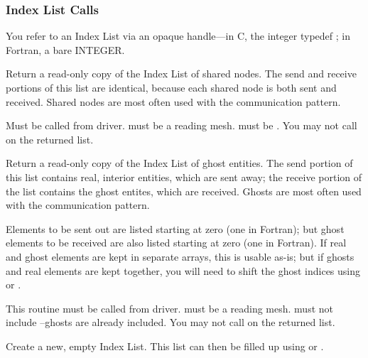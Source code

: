 \subsubsection{Index List Calls}

You refer to an Index List via an opaque handle---in C, the integer typedef ; in Fortran, a bare INTEGER.  



Return a read-only copy of the Index List of shared nodes.  The send and receive portions of this list are identical, because each shared node is both sent and received.  Shared nodes are most often used with the  communication pattern.

Must be called from driver.   must be a reading mesh.  must be .  You may not call  on the returned list.



Return a read-only copy of the Index List of ghost entities.  The send portion of this list contains real, interior entities, which are sent away; the receive portion of the list contains the ghost entites, which are received. Ghosts are most often used with the  communication pattern.

Elements to be sent out are listed starting at zero (one in Fortran); but ghost elements to be received are also listed starting at zero (one in Fortran).  If real and ghost elements are kept in separate arrays, this is usable as-is; but if ghosts and real elements are kept together, you will need to shift the ghost indices using  or . 

This routine must be called from driver.   must be a reading mesh.  must not include --ghosts are already included.  You may not call  on the returned list.



Create a new, empty Index List. This list can then be filled up using  or .

